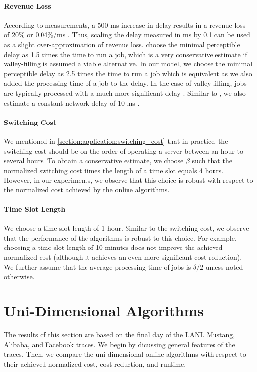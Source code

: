 \paragraph{Revenue Loss} According to measurements, a 500 ms increase in delay results in a revenue loss of 20\% or 0.04\%/ms \cite{Lin2012, Hamilton2009}. Thus, scaling the delay measured in ms by 0.1 can be used as a slight over-approximation of revenue loss. \citeauthor*{Lin2011} choose the minimal perceptible delay as 1.5 times the time to run a job, which is a very conservative estimate if valley-filling is assumed a viable alternative. In our model, we choose the minimal perceptible delay as 2.5 times the time to run a job which is equivalent as we also added the processing time of a job to the delay. In the case of valley filling, jobs are typically processed with a much more significant delay \cite{Lin2011}. Similar to \citeauthor*{Lin2012}, we also estimate a constant network delay of 10 ms \cite{Lin2012}.

\paragraph{Switching Cost} We mentioned in \autoref{section:application:switching_cost} that in practice, the switching cost should be on the order of operating a server between an hour to several hours. To obtain a conservative estimate, we choose $\beta$ such that the normalized switching cost times the length of a time slot equals 4 hours. However, in our experiments, we observe that this choice is robust with respect to the normalized cost achieved by the online algorithms.

\paragraph{Time Slot Length} We choose a time slot length of 1 hour. Similar to the switching cost, we observe that the performance of the algorithms is robust to this choice. For example, choosing a time slot length of 10 minutes does not improve the achieved normalized cost (although it achieves an even more significant cost reduction). We further assume that the average processing time of jobs is $\delta / 2$ unless noted otherwise.

\section{Uni-Dimensional Algorithms}

The results of this section are based on the final day of the LANL Mustang, Alibaba, and Facebook traces. We begin by dicussing general features of the traces. Then, we compare the uni-dimensional online algorithms with respect to their achieved normalized cost, cost reduction, and runtime.

